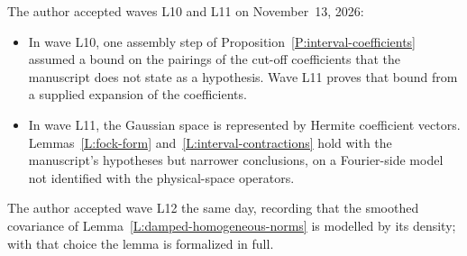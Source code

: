 The author accepted waves L10 and L11 on November~13, 2026:
\begin{itemize}
  \item In wave L10, one assembly step of
    Proposition~\ref{P:interval-coefficients} assumed a bound on the pairings of
    the cut-off coefficients that the manuscript does not state as a hypothesis.
    Wave L11 proves that bound from a supplied expansion of the coefficients.
  \item In wave L11, the Gaussian space is represented by Hermite coefficient
    vectors. Lemmas~\ref{L:fock-form} and~\ref{L:interval-contractions} hold
    with the manuscript's hypotheses but narrower conclusions, on a
    Fourier-side model not identified with the physical-space operators.
\end{itemize}
The author accepted wave L12 the same day, recording that the smoothed
covariance of Lemma~\ref{L:damped-homogeneous-norms} is modelled by its density;
with that choice the lemma is formalized in full.

